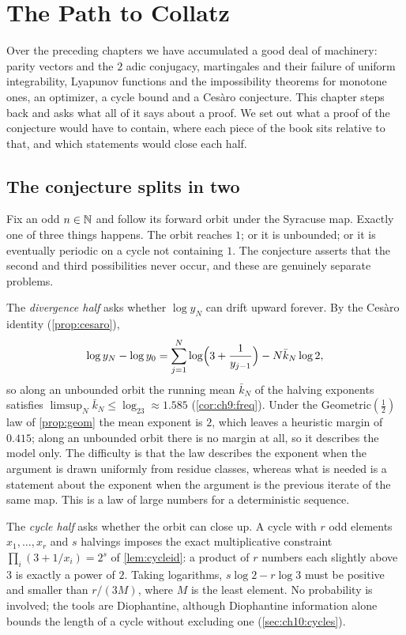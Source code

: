 \chapter{The Path to Collatz}\label{chap:path}

Over the preceding chapters we have accumulated a good deal of machinery: parity
vectors and the $2$ adic conjugacy, martingales and their failure of uniform
integrability, Lyapunov functions and the impossibility theorems for monotone ones, an
optimizer, a cycle bound and a Ces\`aro conjecture. This chapter steps back and
asks what all of it says about a proof. We set out what a proof of the
conjecture would have to contain, where each piece of the book sits relative to
that, and which statements would close each half.

\section{The conjecture splits in two}\label{sec:ch10:split}

Fix an odd $n\in\mathbb{N}$ and follow its forward orbit under the Syracuse map. Exactly one of
three things happens. The orbit reaches $1$; or it is unbounded; or it is
eventually periodic on a cycle not containing $1$. The conjecture asserts that
the second and third possibilities never occur, and these are genuinely
separate problems.

The \emph{divergence half} asks whether $\log y_N$ can drift upward forever.
By the Ces\`aro identity (\cref{prop:cesaro}),
\[
  \log y_N-\log y_0=\sum_{j=1}^N\log\Bigl(3+\frac1{y_{j-1}}\Bigr)-N\bar k_N\log2,
\]
so along an unbounded orbit the running mean $\bar k_N$ of the halving
exponents satisfies $\limsup_N\bar k_N\le\log_23\approx1.585$ (\cref{cor:ch9:freq}). Under the
Geometric$(\tfrac12)$ law of \cref{prop:geom} the mean exponent is $2$, which
leaves a heuristic margin of $0.415$; along an unbounded orbit there is no
margin at all, so it describes the model only. The difficulty is that the law describes the
exponent when the argument is drawn uniformly from residue classes, whereas
what is needed is a statement about the exponent when the argument is the
previous iterate of the same map. This is a law of large numbers for a
deterministic sequence.

The \emph{cycle half} asks whether the orbit can close up. A cycle with $r$
odd elements $x_1,\dots,x_r$ and $s$ halvings imposes the exact multiplicative
constraint $\prod_i(3+1/x_i)=2^s$ of \cref{lem:cycleid}: a product of $r$
numbers each slightly above $3$ is exactly a power of $2$. Taking logarithms,
$s\log2-r\log3$ must be positive and smaller than $r/(3M)$, where $M$ is the
least element. No probability is involved; the tools are Diophantine,
although Diophantine information alone bounds the length of a cycle without
excluding one (\cref{sec:ch10:cycles}).

